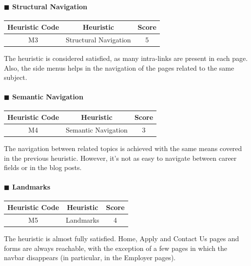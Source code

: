 \documentclass[11pt]{article} %
\begin{document}
\paragraph{$\blacksquare$ Structural Navigation}
\begin{center}
    \begin{tabular}{|c|c|c|} 
    \hline
    \textbf{Heuristic Code} & \textbf{Heuristic} & \textbf{Score}\\ 
    \hline
    M3 & Structural Navigation & 5 \\
    \hline
    \end{tabular}
\end{center}
The heuristic is considered satisfied, as many intra-links are present in each page. Also, the side menus helps in the navigation of the pages related to the same subject.

\paragraph{$\blacksquare$ Semantic Navigation}
\begin{center}
    \begin{tabular}{|c|c|c|} 
    \hline
    \textbf{Heuristic Code} & \textbf{Heuristic} & \textbf{Score}\\ 
    \hline
    M4 & Semantic Navigation & 3 \\
    \hline
    \end{tabular}
\end{center}
The navigation between related topics is achieved with the same means covered in the previous heuristic. However, it's not as easy to navigate between career fields or in the blog posts. 

\paragraph{$\blacksquare$ Landmarks}
\begin{center}
    \begin{tabular}{|c|c|c|} 
    \hline
    \textbf{Heuristic Code} & \textbf{Heuristic} & \textbf{Score}\\ 
    \hline
    M5 & Landmarks & 4 \\
    \hline
    \end{tabular}
\end{center}
The heuristic is almost fully satisfied. Home, Apply and Contact Us pages and forms are always reachable, with the exception of a few pages in which the navbar disappears (in particular, in the Employer pages). 
\end{document}
